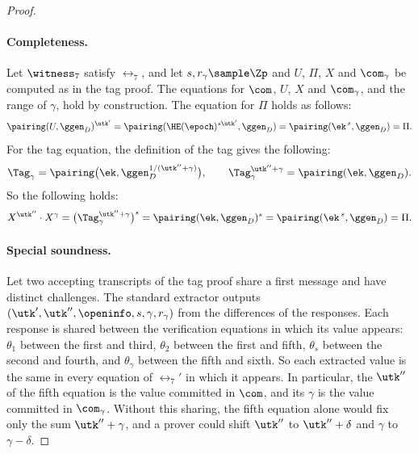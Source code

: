 \begin{proof}

  \paragraph{Completeness.} Let $\witness_7$ satisfy $\rel_7$, and let $s,
r_\gamma \sample \Zp$ and $U$, $\Pi$, $X$ and $\com_\gamma$ be computed as in
the tag proof. The equations for $\com$, $U$, $X$ and $\com_\gamma$, and the
range of $\gamma$, hold by construction. The equation for $\Pi$ holds as
follows:
  \begin{equation*}
    \pairing(U,\ggen_D)^{\utk'} = \pairing(\HE(\epoch)^{s\utk'},\ggen_D) =
\pairing(\ek^{\,s},\ggen_D) = \Pi.
  \end{equation*}
  For the tag equation, the definition of the tag gives the following:
  \begin{equation*}
    \Tag_\gamma = \pairing\big(\ek, \ggen_D^{1/(\utk''+\gamma)}\big), \qquad
\Tag_\gamma^{\utk''+\gamma} = \pairing(\ek,\ggen_D).
  \end{equation*}
  So the following holds:
  \begin{equation*}
    X^{\utk''}\cdot X^{\gamma} = \big(\Tag_\gamma^{\utk''+\gamma}\big)^{s} =
\pairing(\ek,\ggen_D)^{s} = \pairing(\ek^{\,s},\ggen_D) = \Pi.
  \end{equation*}

  \paragraph{Special soundness.} Let two accepting transcripts of the tag proof
share a first message and have distinct challenges. The standard extractor
outputs $(\utk', \utk'', \openinfo, s, \gamma, r_\gamma)$ from the differences
of the responses. Each response is shared between the verification equations
in which its value appears: $\theta_1$ between the first and third, $\theta_2$
between the first and fifth, $\theta_s$ between the second and fourth, and
$\theta_\gamma$ between the fifth and sixth. So each extracted value is the same
in every equation of $\rel_7'$ in which it appears. In particular, the $\utk''$
of the fifth equation is the value committed in $\com$, and its $\gamma$ is the
value committed in $\com_\gamma$. Without this sharing, the fifth equation alone
would fix only the sum $\utk''+\gamma$, and a prover could shift $\utk''$ to
$\utk''+\delta$ and $\gamma$ to $\gamma-\delta$.


\end{proof}
